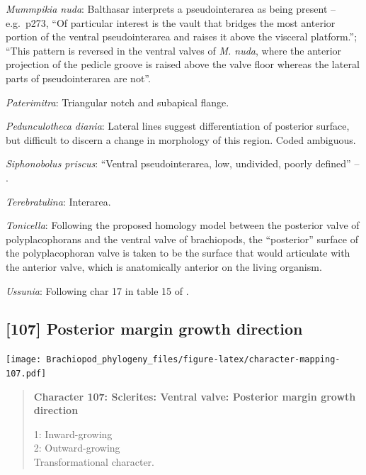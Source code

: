 \documentclass[openany]{book}
\begin{document}
\hypertarget{Mummpikia_nuda-coding-106}{}
\emph{Mummpikia nuda}: Balthasar \citeyearpar{Balthasar2008iMummpikia}
interprets a pseudointerarea as being present -- e.g.~p273, ``Of
particular interest is the vault that bridges the most anterior portion
of the ventral pseudointerarea and raises it above the visceral
platform.''; ``This pattern is reversed in the ventral valves of
\emph{M. nuda}, where the anterior projection of the pedicle groove is
raised above the valve floor whereas the lateral parts of
pseudointerarea are not''.

\hypertarget{Paterimitra-coding-106}{}
\emph{Paterimitra}: Triangular notch and subapical flange.

\hypertarget{Pedunculotheca_diania-coding-106}{}
\emph{Pedunculotheca diania}: Lateral lines suggest differentiation of
posterior surface, but difficult to discern a change in morphology of
this region. Coded ambiguous.

\hypertarget{Siphonobolus_priscus-coding-106}{}
\emph{Siphonobolus priscus}: ``Ventral pseudointerarea, low, undivided,
poorly defined'' -- \citet{Williams2000LinguliformeaCraniiformea}.

\hypertarget{Terebratulina-coding-106}{}
\emph{Terebratulina}: Interarea.

\hypertarget{Tonicella-coding-106}{}
\emph{Tonicella}: Following the proposed homology model between the
posterior valve of polyplacophorans and the ventral valve of
brachiopods, the ``posterior'' surface of the polyplacophoran valve is
taken to be the surface that would articulate with the anterior valve,
which is anatomically anterior on the living organism.

\hypertarget{Ussunia-coding-106}{}
\emph{Ussunia}: Following char 17 in table 15 of
\citet{Williams2000LinguliformeaCraniiformea}.

\subsection*{{[}107{]} Posterior margin growth
direction}\label{posterior-margin-growth-direction}

\texttt{[image: Brachiopod\_phylogeny\_files/figure-latex/character-mapping-107.pdf]}

\begin{quote}
\textbf{Character 107: Sclerites: Ventral valve: Posterior margin growth
direction}

1: Inward-growing\\
2: Outward-growing\\
Transformational character.
\end{quote}
\end{document}
